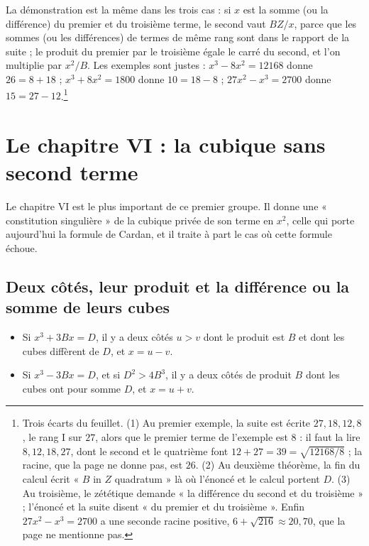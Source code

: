 \documentclass[11pt,a4paper]{article}
\begin{document}
La démonstration est la même dans les trois cas : si $x$ est la somme (ou la
différence) du premier et du troisième terme, le second vaut $BZ/x$, parce que
les sommes (ou les différences) de termes de même rang sont dans le rapport de
la suite ; le produit du premier par le troisième égale le carré du second, et
l'on multiplie par $x^2/B$. Les exemples sont justes : $x^3 - 8x^2 = 12168$
donne $26 = 8 + 18$ ; $x^3 + 8x^2 = 1800$ donne $10 = 18 - 8$ ;
$27x^2 - x^3 = 2700$ donne $15 = 27 - 12$.\footnote{Trois écarts du feuillet.
(1) Au premier exemple, la suite est écrite $27, 18, 12, 8$, le rang I sur $27$,
alors que le premier terme de l'exemple est $8$ : il faut la lire $8, 12, 18,
27$, dont le second et le quatrième font $12 + 27 = 39 = \sqrt{12168/8}$ ; la
racine, que la page ne donne pas, est $26$. (2) Au deuxième théorème, la fin du
calcul écrit « $B$ in $Z$ quadratum » là où l'énoncé et le calcul portent $D$.
(3) Au troisième, le zététique demande « la différence du second et du
troisième » ; l'énoncé et la suite disent « du premier et du troisième ». Enfin
$27x^2 - x^3 = 2700$ a une seconde racine positive, $6 + \sqrt{216} \approx
20{,}70$, que la page ne mentionne pas.}

\section*{Le chapitre VI : la cubique sans second terme}

Le chapitre VI est le plus important de ce premier groupe. Il donne une
« constitution singulière » de la cubique privée de son terme en $x^2$, celle
qui porte aujourd'hui la formule de Cardan, et il traite à part le cas où
cette formule échoue.

\subsection*{Deux côtés, leur produit et la différence ou la somme de leurs cubes}

\begin{itemize}
  \item Si $x^3 + 3Bx = D$, il y a deux côtés $u > v$ dont le produit est $B$ et
    dont les cubes diffèrent de $D$, et $x = u - v$.
  \item Si $x^3 - 3Bx = D$, et si $D^2 > 4B^3$, il y a deux côtés de produit $B$
    dont les cubes ont pour somme $D$, et $x = u + v$.
\end{itemize}
\end{document}

